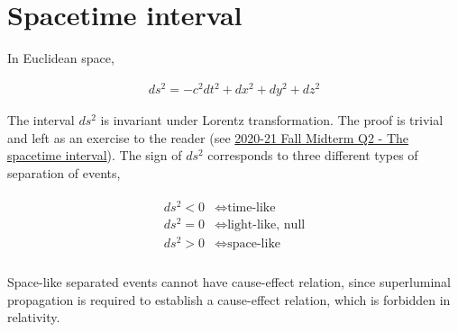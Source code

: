 \documentclass[12pt]{book} %
\numberwithin{equation}{chapter}
\def\iff{\Longleftrightarrow}
\begin{document}
\section{Spacetime interval}
In Euclidean space,
\begin{eqnbox}
\begin{align}
ds^{2}=-c^{2}dt^{2}+dx^{2}+dy^{2}+dz^{2}
\end{align}
\end{eqnbox}
The interval $ds^{2}$ is invariant under Lorentz transformation. The proof is trivial and left as an exercise to the reader (see \hyperref[The spacetime interval]{2020-21 Fall Midterm Q2 - The spacetime interval}).\bigskip\newline
The sign of $ds^{2}$ corresponds to three different types of separation of events,
\begin{eqnbox}
\begin{align}
\begin{split}
ds^{2}<0&\iff \text{time-like}\\
ds^{2}=0&\iff \text{light-like, null}\\
ds^{2}>0&\iff \text{space-like}\\
\end{split}
\end{align}
\end{eqnbox}
Space-like separated events cannot have cause-effect relation, since superluminal propagation is required to establish a cause-effect relation, which is forbidden in relativity.
\end{document}
